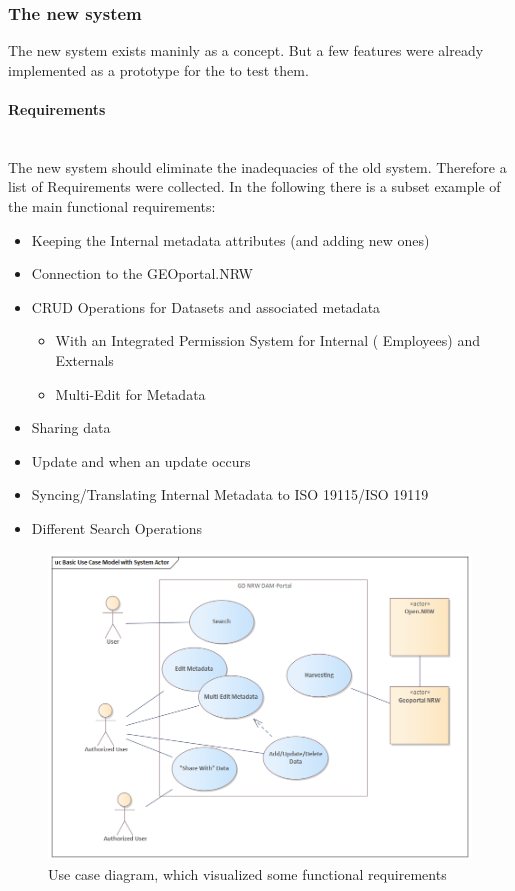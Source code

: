 \documentclass[11pt, titlepage, a4paper]{article}
\newcommand{\myparagraph}[1]{\paragraph{#1}\mbox{}\\}
\begin{document}
\subsubsection{The new system}
The new system exists maninly as a concept. But a few features were already implemented as a prototype for the  to test them.
\myparagraph{Requirements}
The new system should eliminate the inadequacies of the old system. Therefore a list of Requirements were collected. In the following there is a subset example of the main functional requirements:
\begin{itemize}
	\item Keeping the Internal metadata attributes (and adding new ones)
	\item Connection to the GEOportal.NRW
	\item CRUD Operations for Datasets and associated metadata
	      \begin{itemize}
		      \item With an Integrated Permission System for Internal ( Employees) and Externals
		      \item Multi-Edit for Metadata
	      \end{itemize}
	\item Sharing data
	\item Update  and  when an update occurs
	\item Syncing/Translating Internal Metadata to ISO 19115/ISO 19119
	\item Different Search Operations
\end{itemize}


\begin{figure}[t]
	\caption{Use case diagram, which visualized some functional requirements}
	\label{fig:usecase}
	\includegraphics[width=16cm]{usecase_diagramm.png}
	\centering
\end{figure}
\end{document}
